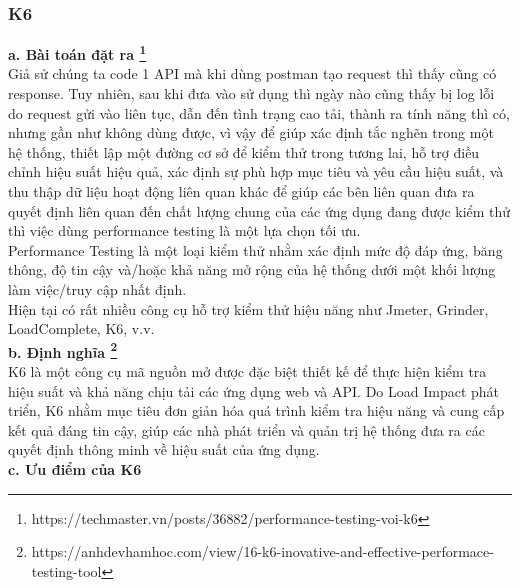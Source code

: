 \subsubsection{K6}
\textbf{a. Bài toán đặt ra \footnote{https://techmaster.vn/posts/36882/performance-testing-voi-k6}}\\[0.5cm]
Giả sử chúng ta code 1 API mà khi dùng postman tạo request thì thấy cũng có response. Tuy nhiên, sau khi đưa vào sử dụng thì ngày nào cũng thấy bị log lỗi do request gửi vào liên tục, dẫn đến tình trạng cao tải, thành ra tính năng thì có, nhưng gần như không dùng được, vì vậy để giúp xác định tắc nghẽn trong một hệ thống, thiết lập một đường cơ sở để kiểm thử trong tương lai, hỗ trợ điều chỉnh hiệu suất hiệu quả, xác định sự phù hợp mục tiêu và yêu cầu hiệu suất, và thu thập dữ liệu hoạt động liên quan khác để giúp các bên liên quan đưa ra quyết định liên quan đến chất lượng chung của các ứng dụng đang được kiểm thử thì việc dùng performance testing là một lựa chọn tối ưu.\\[0.5cm]
Performance Testing là một loại kiểm thử nhằm xác định mức độ đáp ứng, băng thông, độ tin cậy và/hoặc khả năng mở rộng của hệ thống dưới một khối lượng làm việc/truy cập nhất định.\\[0.5cm]
Hiện tại có rất nhiều công cụ hỗ trợ kiểm thử hiệu năng như Jmeter, Grinder, LoadComplete, K6, v.v.\\[0.5cm]
\textbf{b. Định nghĩa \footnote{https://anhdevhamhoc.com/view/16-k6-inovative-and-effective-performace-testing-tool}}\\[0.5cm]
K6 là một công cụ mã nguồn mở được đặc biệt thiết kế để thực hiện kiểm tra hiệu suất và khả năng chịu tải các ứng dụng web và API. Do Load Impact phát triển, K6 nhằm mục tiêu đơn giản hóa quá trình kiểm tra hiệu năng và cung cấp kết quả đáng tin cậy, giúp các nhà phát triển và quản trị hệ thống đưa ra các quyết định thông minh về hiệu suất của ứng dụng.\\[0.5cm]
\textbf{c. Ưu điểm của K6}
